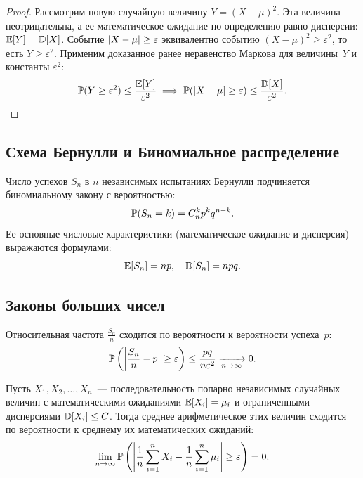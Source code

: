 \begin{proof}
Рассмотрим новую случайную величину $Y = (X - \mu)^2$. Эта величина неотрицательна, а ее математическое ожидание по определению равно дисперсии: $\E[Y] = \Var[X]$.
Событие $\abs{X - \mu} \ge \varepsilon$ эквивалентно событию $(X - \mu)^2 \ge \varepsilon^2$, то есть $Y \ge \varepsilon^2$.
Применим доказанное ранее неравенство Маркова для величины~$Y$ и константы $\varepsilon^2$:
\[
\Prob(Y \ge \varepsilon^2) \le \frac{\E[Y]}{\varepsilon^2} \implies \Prob(\abs{X - \mu} \ge \varepsilon) \le \frac{\Var[X]}{\varepsilon^2}.
\]
\end{proof}

\subsection{Схема Бернулли и Биномиальное распределение}
Число успехов $S_n$ в $n$ независимых испытаниях Бернулли подчиняется биномиальному закону с вероятностью:
\[
\Prob(S_n = k) = C_n^k p^k q^{n-k}.
\]
Ее основные числовые характеристики (математическое ожидание и дисперсия) выражаются формулами:
\[
\E[S_n] = n p, \quad \Var[S_n] = n p q.
\]

\subsection{Законы больших чисел}

\begin{theorem}
Относительная частота $\frac{S_n}{n}$ сходится по вероятности к вероятности успеха~$p$:
\[
\Prob\left(\abs*{\frac{S_n}{n} - p} \ge \varepsilon\right) \le \frac{p q}{n \varepsilon^2} \xrightarrow[n \to \infty]{} 0.
\]
\end{theorem}

\begin{theorem}
Пусть $X_1, X_2, \dots, X_n$~--- последовательность попарно независимых случайных величин с математическими ожиданиями $\E[X_i] = \mu_i$ и ограниченными дисперсиями $\Var[X_i] \le C$. Тогда среднее арифметическое этих величин сходится по вероятности к среднему их математических ожиданий:
\[
\lim_{n \to \infty} \Prob\left(\abs*{\frac{1}{n}\sum_{i=1}^n X_i - \frac{1}{n}\sum_{i=1}^n \mu_i} \ge \varepsilon\right) = 0.
\]
\end{theorem}

